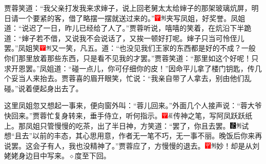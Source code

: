 贾蓉笑道：“我父亲打发我来求婶子，说上回老舅太太给婶子的那架玻璃炕屏，明日请一个要紧的客，借了略摆一摆就送过来的。”{\includegraphics[width=3mm]{../Images/00002}\includegraphics[width=3mm]{../Images/00011}\footnotesize \kaishu 夹写凤姐，好奖誉。}凤姐道：“说迟了一日，昨儿已经给了人了。”贾蓉听说，嘻嘻的笑着，在炕沿下半跪道：“婶子若不借，又说我不会说话了，又挨一顿好打呢。婶子只当可怜侄儿罢。”凤姐笑{\includegraphics[width=3mm]{../Images/00002}\includegraphics[width=3mm]{../Images/00011}\footnotesize \kaishu 又一笑，凡五。}道：“也没见我们王家的东西都是好的不成？一般你们那里放着那些东西，只是看不见我的才罢。”贾蓉笑道：“那里如这个好呢！只求开恩罢。”凤姐道：“碰一点儿，你可仔细你的皮！”因命平儿拿了楼门钥匙，传几个妥当人来抬去。贾蓉喜的眉开眼笑，忙说：“我亲自带了人拿去，别由他们乱碰。”说着便起身出去了。

这里凤姐忽又想起一事来，便向窗外叫：“蓉儿回来。”外面几个人接声说：“蓉大爷快回来。”贾蓉忙复身转来，垂手侍立，听何指示。{\includegraphics[width=3mm]{../Images/00002}\includegraphics[width=3mm]{../Images/00010}\footnotesize \kaishu 传神之笔，写阿凤跃跃纸上。}那凤姐只管慢慢的吃茶，出了半日神，方笑道：“罢了，你且去罢。{\includegraphics[width=3mm]{../Images/00006}\includegraphics[width=3mm]{../Images/00011}\footnotesize \kaishu 试想“且去”以前的丰态，其心思用意，作者无一笔不巧，无一事不丽。}晚饭后你来再说罢。这会子有人，我也没精神了。”贾蓉应了，方慢慢的退去。{\includegraphics[width=3mm]{../Images/00002}\includegraphics[width=3mm]{../Images/00011}\footnotesize \kaishu 妙！却是从刘姥姥身边目中写来。{$\diamond$}度至下回。}

